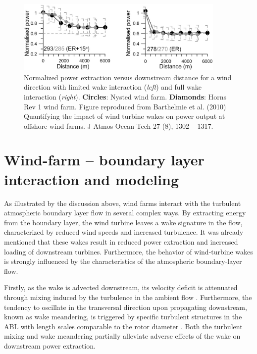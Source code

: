 \begin{figure}[t]
	\centering
	\includegraphics[width=0.9\textwidth]{chapters/introduction/power_barthelmie.eps}
	\caption[Normalized power extraction versus downstream distance for a wind direction with limited wake interaction and full wake interaction.]{Normalized power extraction versus downstream distance for a wind direction with limited wake interaction (\emph{left}) and full wake interaction (\emph{right}). \textbf{Circles}: Nysted wind farm. {\color{gray} \textbf{Diamonds}}: Horns Rev 1 wind farm. Figure reproduced from Barthelmie et al. (2010) Quantifying the impact of wind turbine wakes on power output at offshore wind farms. J Atmos Ocean Tech 27 (8), 1302 -- 1317. \label{fig:power_deficiency}}
\end{figure}

\section{Wind-farm -- boundary layer interaction and modeling}\label{sec:intro_wfbl}
As illustrated by the discussion above, wind farms interact with the turbulent atmospheric boundary layer flow in several complex ways. By extracting energy from the boundary layer, the wind turbine leaves a wake signature in the flow, characterized by reduced wind speeds and increased turbulence. It was already mentioned that these wakes result in reduced power extraction and increased loading of downstream turbines. Furthermore, the behavior of wind-turbine wakes is strongly influenced by the characteristics of the atmospheric boundary-layer flow. 

Firstly, as the wake is advected downstream, its velocity deficit is attenuated through mixing induced by the turbulence in the ambient flow \citep{Chamorro2009}. Furthermore, the tendency to oscillate in the transversal direction upon propagating downstream, known as wake meandering, is triggered by specific turbulent structures in the ABL with length scales comparable to the rotor diameter \citep{espana2011spatial,espanawind}. Both the turbulent mixing and wake meandering partially alleviate adverse effects of the wake on downstream power extraction. 

